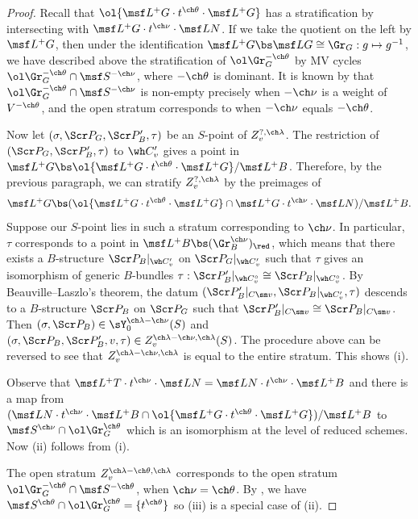 \begin{proof}
Recall that $\ol{\msf L^+G\cdot t^{\ch\theta}\cdot \msf L^+G}$ has a stratification
by intersecting with $\msf L^+G\cdot t^{\ch\nu}\cdot \msf L N$.
If we take the quotient on the left by $\msf L^+ G$, then
under the identification
$\msf L^+G \bs \msf L G \cong \Gr_G : g \mapsto g^{-1}$, we have
described above the stratification of $\ol\Gr^{-\ch\theta}_G$
by MV cycles $\ol\Gr^{-\ch\theta}_G \cap \msf S^{-\ch\nu}$, where
$-\ch\theta$ is dominant.
It is known by \cite[Theorem 3.2]{MV} that
$\ol\Gr^{-\ch\theta}_G \cap \msf S^{-\ch\nu}$
is non-empty precisely when $-\ch\nu$ is a weight of
$V^{-\ch\theta}$, and the open stratum corresponds to
when $-\ch\nu$ equals $-\ch\theta$.

Now let $(\sigma,\Scr P_G, \Scr P'_B,\tau)$ be an $S$-point of
$Z_v^{?,\ch\lambda}$. The restriction of $(\Scr P_G,\Scr P'_B,\tau)$
to $\wh C'_v$ gives a point in $\msf L^+G \bs \ol{\msf L^+G \cdot t^{\ch\theta} \cdot \msf L^+ G} / \msf L^+ B$.
Therefore, by the previous paragraph, we can stratify $Z_v^{?,\ch\lambda}$
by the preimages of
\[  \msf L^+G \bs (\ol{\msf L^+G\cdot t^{\ch\theta}\cdot \msf L^+G} \cap \msf L^+G\cdot t^{\ch\nu}\cdot \msf L N) / \msf L^+B . \]
Suppose our $S$-point lies in such a stratum corresponding to $\ch\nu$.
In particular, $\tau$
corresponds to a point in $\msf L^+B \bs (\Gr^{\ch\nu}_B)_\red$,
which means that there exists a $B$-structure $\Scr P_B|_{\wh C'_v}$
on $\Scr P_G|_{\wh C'_v}$ such that $\tau$ gives an isomorphism
of generic $B$-bundles
$\tau : \Scr P'_B|_{\wh C^\circ_v} \cong \Scr P_B|_{\wh C^\circ_v}$.
By Beauville--Laszlo's theorem, the datum $(\Scr P'_B|_{C\sm v}, \Scr P_B|_{\wh C'_v},\tau)$ descends to a $B$-structure $\Scr P_B$ on $\Scr P_G$
such that
$\Scr P'_B|_{C\sm v} \cong \Scr P_B|_{C\sm v}$.
Then $(\sigma, \Scr P_B) \in \sY_0^{\ch\lambda-\ch\nu}(S)$ and
$(\sigma,\Scr P_B, \Scr P'_B, v, \tau) \in Z_v^{\ch\lambda-\ch\nu,\ch\lambda}(S)$.
The procedure above can be reversed to see that $Z_v^{\ch\lambda-\ch\nu,\ch\lambda}$ is equal to the entire stratum.
This shows (i).



Observe that $\msf L^+ T \cdot t^{\ch\nu} \cdot \msf L N = \msf L N \cdot t^{\ch\nu} \cdot \msf L^+B$ and
there is a map from
$(\msf L N \cdot t^{\ch\nu} \cdot \msf L^+B \cap \ol{\msf L^+G \cdot t^{\ch\theta} \cdot \msf L^+G})/\msf L^+B$ to $\msf S^{\ch\nu}\cap \ol\Gr^{\ch\theta}_G$ which is an isomorphism at the level of reduced schemes.
Now (ii) follows from (i).

The open stratum $Z_v^{\ch\lambda-\ch\theta,\ch\lambda}$
corresponds to the open stratum $\ol\Gr^{-\ch\theta}_G \cap \msf S^{-\ch\theta}$,
when $\ch\nu=\ch\theta$.
By \cite[(3.6)]{MV}, we have $\msf S^{\ch\theta} \cap \ol\Gr^{\ch\theta}_G = \{t^{\ch\theta}\}$
so (iii) is a special case of (ii).
\end{proof}

